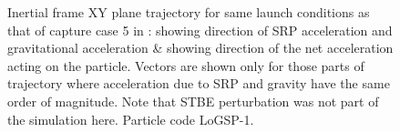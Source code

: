 \begin{figure}[htb]
\caption{Inertial frame XY plane trajectory for same launch conditions as that of capture case 5 in : \protect{} showing direction of \gls{SRP} acceleration and gravitational acceleration \& \protect{} showing direction of the net acceleration acting on the particle. Vectors are shown only for those parts of trajectory where acceleration due to \gls{SRP} and gravity have the same order of magnitude. Note that \gls{STBE} perturbation was not part of the simulation here. Particle code LoGSP-1.}
\end{figure}
\FloatBarrier

